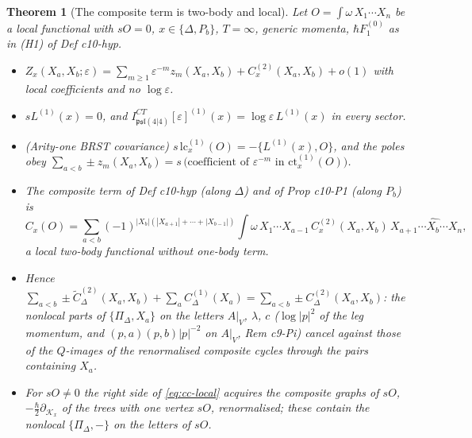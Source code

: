 \documentclass[11pt]{article}
\numberwithin{equation}{section}
\theoremstyle{plain}
\newtheorem{theorem}{Theorem}[section]
\theoremstyle{definition}
\newcommand{\AV}{A|_V}
\begin{document}
\begin{theorem}[The composite term is two-body and local]
\label{thm:cc-local}
Let $O=\int\omega\,X_1\cdots X_n$ be a local functional with $sO=0$, $x\in\{\Delta,P_b\}$, $T=\infty$, generic momenta, $\hbar F_1^{(0)}$ as in (H1) of Def c10-hyp.
\begin{itemize}
\item[(i)] $Z_x(X_a,X_b;\varepsilon)=\sum_{m\ge1}\varepsilon^{-m}z_m(X_a,X_b)+C^{(2)}_x(X_a,X_b)+o(1)$ with local coefficients and no $\log\varepsilon$.
\item[(ii)] $sL^{(1)}(x)=0$, and $I^{CT}_{\mathfrak{psl}(4|4)}[\varepsilon]^{(1)}(x)=\log\varepsilon\,L^{(1)}(x)$ in every sector.
\item[(iii)] (Arity-one BRST covariance) $s\,\mathrm{lc}^{(1)}_x(O)=-\{L^{(1)}(x),O\}$, and the poles obey $\sum_{a<b}\pm z_m(X_a,X_b)=s\,\big(\text{coefficient of }\varepsilon^{-m}\text{ in }\mathrm{ct}^{(1)}_x(O)\big)$.
\item[(iv)] The composite term of Def c10-hyp (along $\Delta$) and of Prop c10-P1 (along $P_b$) is
\begin{equation}
C_x(O)=\sum_{a<b}(-1)^{|X_b|(|X_{a+1}|+\cdots+|X_{b-1}|)}\int\omega\,X_1\cdots X_{a-1}\,C^{(2)}_x(X_a,X_b)\,X_{a+1}\cdots\widehat{X_b}\cdots X_n,
\label{eq:cc-local}
\end{equation}
a local two-body functional without one-body term.
\item[(v)] Hence $\sum_{a<b}\pm\widetilde C^{(2)}_\Delta(X_a,X_b)+\sum_aC^{(1)}_\Delta(X_a)=\sum_{a<b}\pm C^{(2)}_\Delta(X_a,X_b)$: the nonlocal parts of $\{\Pi_\Delta,X_a\}$ on the letters $\AV$, $\lambda$, $c$ ($\log|p|^2$ of the leg momentum, and $(p,a)(p,b)|p|^{-2}$ on $\AV$, Rem c9-Pi) cancel against those of the $Q$-images of the renormalised composite cycles through the pairs containing $X_a$.
\item[(vi)] For $sO\ne0$ the right side of \eqref{eq:cc-local} acquires the composite graphs of $sO$, $-\tfrac\hbar2\partial_{\mathcal K_x}$ of the trees with one vertex $sO$, renormalised; these contain the nonlocal $\{\Pi_\Delta,-\}$ on the letters of $sO$.
\end{itemize}
\end{theorem}
\end{document}
